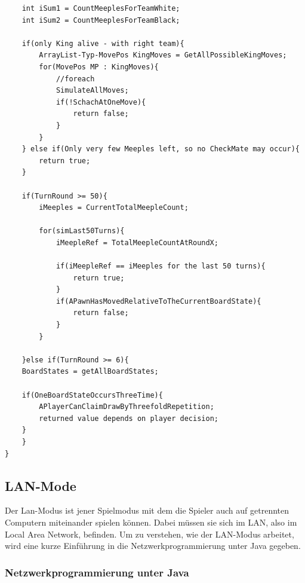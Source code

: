 \documentclass[12pt,a4paper]{article}
\begin{document}
{\begin{lstlisting}
	int iSum1 = CountMeeplesForTeamWhite;
	int iSum2 = CountMeeplesForTeamBlack;
	
	if(only King alive - with right team){
		ArrayList-Typ-MovePos KingMoves = GetAllPossibleKingMoves;
		for(MovePos MP : KingMoves){ 
			//foreach
			SimulateAllMoves;
			if(!SchachAtOneMove){
				return false;
			}		
		}		
	} else if(Only very few Meeples left, so no CheckMate may occur){
		return true;		
	}
	
	if(TurnRound >= 50){
		iMeeples = CurrentTotalMeepleCount;
		
		for(simLast50Turns){
			iMeepleRef = TotalMeepleCountAtRoundX;
			
			if(iMeepleRef == iMeeples for the last 50 turns){
				return true;
			}
			if(APawnHasMovedRelativeToTheCurrentBoardState){
				return false;
			}
		}
		
	}else if(TurnRound >= 6){
	BoardStates = getAllBoardStates;
	
	if(OneBoardStateOccursThreeTime){
		APlayerCanClaimDrawByThreefoldRepetition;	
		returned value depends on player decision;
	}
	}
}
\end{lstlisting}

\newpage
\subsection{LAN-Mode}

Der Lan-Modus ist jener Spielmodus mit dem die Spieler auch auf getrennten Computern miteinander spielen können. Dabei müssen sie sich im LAN, also im Local Area Network, befinden. Um zu verstehen, wie der LAN-Modus arbeitet, wird eine kurze Einführung in die Netzwerkprogrammierung unter Java gegeben. 

\subsubsection{Netzwerkprogrammierung unter Java}

}
\end{document}
